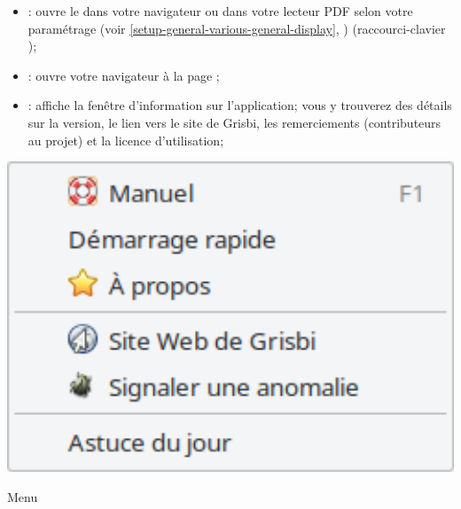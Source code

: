 \vspace{3mm}
\noindent
\begin{minipage}{.7\linewidth}
	\begin{itemize}[rightmargin=.6cm]
		\item {}: ouvre le  %
		dans votre navigateur ou dans votre lecteur \gls{PDF} selon votre paramétrage (voir \vref{setup-general-various-general-display}, ) (raccourci-clavier );
		\item {}: ouvre votre navigateur à la page ;
		\item {}: affiche la fenêtre d'information sur l'application; vous y trouverez des détails sur la version, le lien vers le site de Grisbi, les remerciements (contributeurs au projet) et la licence d'utilisation;
	\end{itemize}
\end{minipage}
\hspace{10pt}	
\begin{minipage}{.3\linewidth}
	\centering						%
	\includegraphics[width=1\textwidth]{image/screenshot/home_menubar_help}
	\vspace{-15pt}					%
	\captionsetup{
		type=figure,%
		name=Fig.,%
		labelsep=newline}			%
	\caption{Menu }	%
	\label{home_menubar_help}
\end{minipage} 

